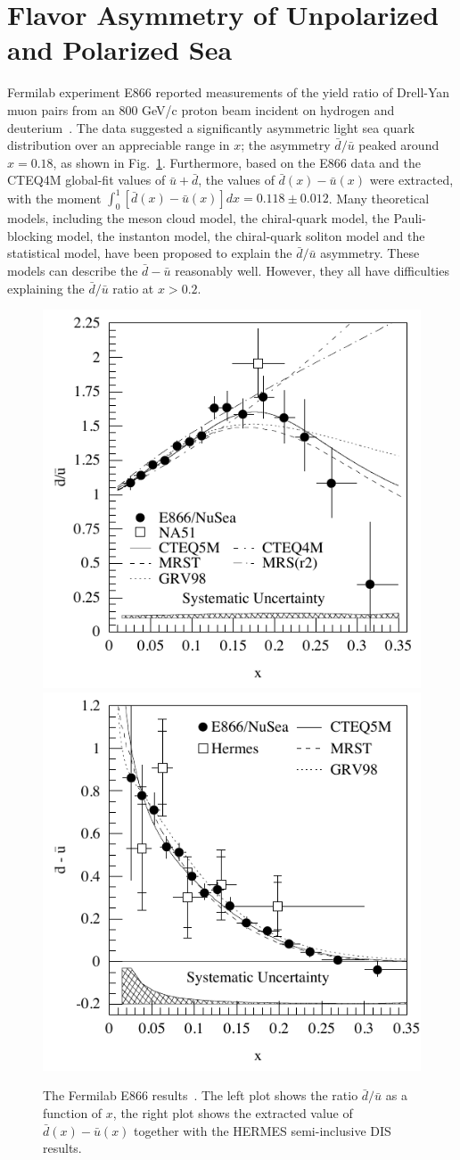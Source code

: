 \section{Flavor Asymmetry of Unpolarized and Polarized Sea}
 Fermilab experiment E866 reported measurements of the 
 yield ratio of Drell-Yan muon pairs
 from an 800 GeV/c proton beam incident on hydrogen and deuterium~\cite{e8661,e8662}. 
The data suggested a significantly  asymmetric light sea quark distribution over an 
 appreciable range in $x$; the asymmetry $\bar{d}/\bar{u}$ peaked around $x=0.18$, as shown in Fig.~\ref{fig:e866}.
 Furthermore, based on the E866 data and the CTEQ4M global-fit values of $\bar{u}+\bar{d}$,  
 the values of $\bar{d}(x) - \bar{u}(x)$ were extracted, with the moment
 $\int_{0}^{1} \left[ \bar{d}(x) - \bar{u}(x) \right]dx = 0.118 \pm 0.012$.
 Many theoretical models, including the meson cloud model, the chiral-quark model,
the Pauli-blocking model, the instanton model, the chiral-quark soliton model and 
the statistical model, have been proposed to explain the $\bar{d}/\bar{u}$ asymmetry.
These models can describe the $\bar{d}-\bar{u}$ reasonably well. However, they all have difficulties 
explaining the $\bar{d}/\bar{u}$ ratio at $x>0.2$.  
\begin{figure}[htbp]
\centerline{
\includegraphics[width=0.50\linewidth]{figs_xj/e866_dbub.pdf}
\includegraphics[width=0.50\linewidth]{figs_xj/e866_dmu.pdf}
}
\vspace{-2mm}
\caption{The Fermilab E866 results~\protect\cite{e8661,e8662}. 
The left plot shows the ratio  ${\bar d}/{\bar u}$ as a function of $x$, the right plot 
shows the extracted  value of $\bar{d}(x) - \bar{u}(x)$ together with the HERMES semi-inclusive  
DIS results.
}
\label{fig:e866}
\end{figure}

